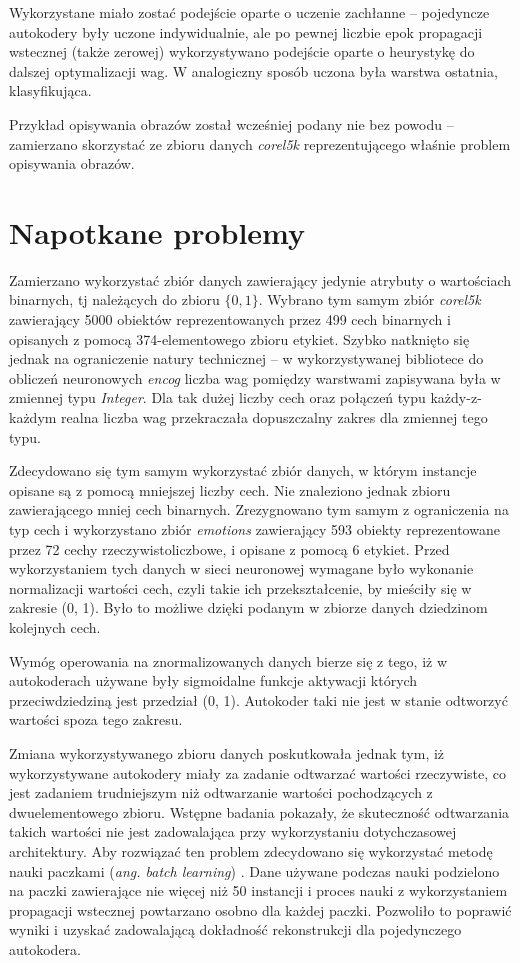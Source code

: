 \documentclass[11pt,a4paper,oneside]{report}
\begin{document}
Wykorzystane miało zostać podejście oparte o uczenie zachłanne -- pojedyncze autokodery były uczone indywidualnie, ale po pewnej liczbie epok propagacji wstecznej (także zerowej) wykorzystywano podejście oparte o heurystykę do dalszej optymalizacji wag. W analogiczny sposób uczona była warstwa ostatnia, klasyfikująca.

Przykład opisywania obrazów został wcześniej podany nie bez powodu -- zamierzano skorzystać ze zbioru danych \textit{corel5k} \cite{alcala2010keel} reprezentującego właśnie problem opisywania obrazów.

\section{Napotkane problemy}

Zamierzano wykorzystać zbiór danych zawierający jedynie atrybuty o wartościach binarnych, tj należących do zbioru $\lbrace 0, 1 \rbrace$. Wybrano tym samym zbiór \textit{corel5k} zawierający 5000 obiektów reprezentowanych przez 499 cech binarnych i opisanych z pomocą 374-elementowego zbioru etykiet. Szybko natknięto się jednak na ograniczenie natury technicznej -- w wykorzystywanej bibliotece do obliczeń neuronowych \textit{encog} liczba wag pomiędzy warstwami zapisywana była w zmiennej typu \textit{Integer}. Dla tak dużej liczby cech oraz połączeń typu każdy-z-każdym realna liczba wag przekraczała dopuszczalny zakres dla zmiennej tego typu.

Zdecydowano się tym samym wykorzystać zbiór danych, w którym instancje opisane są z pomocą mniejszej liczby cech. Nie znaleziono jednak zbioru zawierającego mniej cech binarnych. Zrezygnowano tym samym z ograniczenia na typ cech i wykorzystano zbiór \textit{emotions} \cite{alcala2010keel} zawierający 593 obiekty reprezentowane przez 72 cechy rzeczywistoliczbowe, i opisane z pomocą 6 etykiet. Przed wykorzystaniem tych danych w sieci neuronowej wymagane było wykonanie normalizacji wartości cech, czyli takie ich przekształcenie, by mieściły się w zakresie (0, 1). Było to możliwe dzięki podanym w zbiorze danych dziedzinom kolejnych cech.

Wymóg operowania na znormalizowanych danych bierze się z tego, iż w autokoderach używane były sigmoidalne funkcje aktywacji których przeciwdziedziną jest przedział (0, 1). Autokoder taki nie jest w stanie odtworzyć wartości spoza tego zakresu.

Zmiana wykorzystywanego zbioru danych poskutkowała jednak tym, iż wykorzystywane autokodery miały za zadanie odtwarzać wartości rzeczywiste, co jest zadaniem trudniejszym niż odtwarzanie wartości pochodzących z dwuelementowego zbioru. Wstępne badania pokazały, że skuteczność odtwarzania takich wartości nie jest zadowalająca przy wykorzystaniu dotychczasowej architektury. Aby rozwiązać ten problem zdecydowano się wykorzystać metodę nauki paczkami (\textit{ang. batch learning}) \cite{ngiam2011optimization}. Dane używane podczas nauki podzielono na paczki zawierające nie więcej niż 50 instancji i proces nauki z wykorzystaniem propagacji wstecznej powtarzano osobno dla każdej paczki. Pozwoliło to poprawić wyniki i uzyskać zadowalającą dokładność rekonstrukcji dla pojedynczego autokodera.
\end{document}
